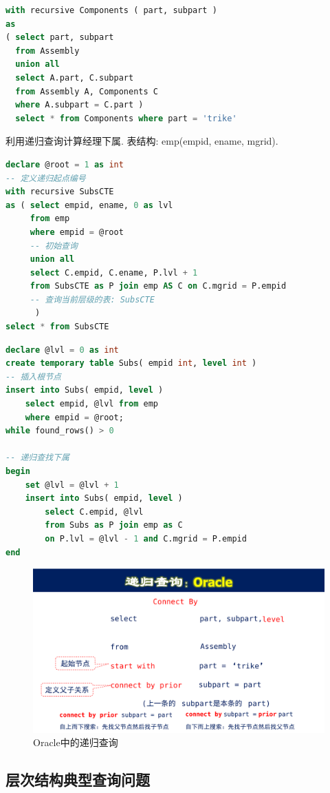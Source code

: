\begin{lstlisting}[language=SQL]
with recursive Components ( part, subpart )
as
( select part, subpart
  from Assembly
  union all
  select A.part, C.subpart
  from Assembly A, Components C
  where A.subpart = C.part )
  select * from Components where part = 'trike'
\end{lstlisting}

\begin{example}
    利用递归查询计算经理下属. 表结构: emp(empid, ename, mgrid).
\end{example}

\begin{lstlisting}[language=SQL]
declare @root = 1 as int
-- 定义递归起点编号
with recursive SubsCTE
as ( select empid, ename, 0 as lvl
     from emp
     where empid = @root
     -- 初始查询
     union all
     select C.empid, C.ename, P.lvl + 1
     from SubsCTE as P join emp AS C on C.mgrid = P.empid
     -- 查询当前层级的表: SubsCTE
      )
select * from SubsCTE    
\end{lstlisting}

\begin{lstlisting}[language=SQL]
declare @lvl = 0 as int
create temporary table Subs( empid int, level int )
-- 插入根节点
insert into Subs( empid, level )
    select empid, @lvl from emp
    where empid = @root;
while found_rows() > 0

-- 递归查找下属
begin
    set @lvl = @lvl + 1
    insert into Subs( empid, level )
        select C.empid, @lvl
        from Subs as P join emp as C
        on P.lvl = @lvl - 1 and C.mgrid = P.empid
end    
\end{lstlisting}

\begin{figure}[H]
    \centering
    \includegraphics[width=.6\textwidth]{./figure/递归查询.pdf}
    \caption{Oracle中的递归查询}
\end{figure}

\subsection{层次结构典型查询问题}

